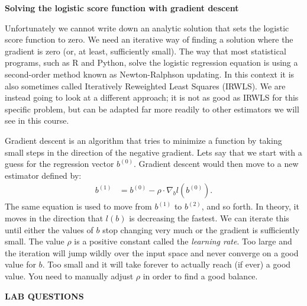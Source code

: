 \documentclass[12pt,hidelinks]{article}
\numberwithin{equation}{section}
\begin{document}
\textbf{Solving the logistic score function with gradient descent}

Unfortunately we cannot write down an analytic solution that sets the
logistic score function to zero. We need an iterative way of finding a solution
where the gradient is zero (or, at least, sufficiently small). The way that
most statistical programs, such as R and Python, solve the logistic regression
equation is using a second-order method known as Newton-Ralphson updating. In
this context it is also sometimes called Iteratively Reweighted Least Squares
(IRWLS). We are instead going to look at a different approach; it is not as
good as IRWLS for this specific problem, but can be adapted far more readily
to other estimators we will see in this course.

Gradient descent is an algorithm that tries to minimize a function by taking
small steps in the direction of the negative gradient. Lets say that we start
with a guess for the regression vector $b^{(0)}$. Gradient descent would then
move to a new estimator defined by:
\begin{align}
b^{(1)} &= b^{(0)} - \rho \cdot \nabla_b l(b^{(0)}).
\end{align}
The same equation is used to move from $b^{(1)}$ to $b^{(2)}$, and so forth.
In theory, it moves in the direction that $l(b)$ is decreasing the fastest. We
can iterate this until either the values of $b$ stop changing very much or the
gradient is sufficiently small. The value $\rho$ is a positive constant called
the \textit{learning rate}. Too large and the iteration will jump wildly over
the input space and never converge on a good value for $b$. Too small and it
will take forever to actually reach (if ever) a good value. You need to
manually adjust $\rho$ in order to find a good balance.

\newpage

\textbf{LAB QUESTIONS}

\vspace*{0pt}
\end{document}
